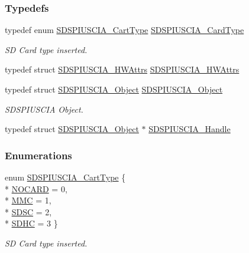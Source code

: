 \subsubsection*{Typedefs}
\begin{DoxyCompactItemize}
\item 
typedef enum \hyperlink{_s_d_s_p_i_u_s_c_i_a_8h_ad08dd3019effc5263edc6374ce89d87a}{S\-D\-S\-P\-I\-U\-S\-C\-I\-A\-\_\-\-Cart\-Type} \hyperlink{_s_d_s_p_i_u_s_c_i_a_8h_a5852060f107db1a20619f34ec6bc1f07}{S\-D\-S\-P\-I\-U\-S\-C\-I\-A\-\_\-\-Card\-Type}
\begin{DoxyCompactList}\small\item\em S\-D Card type inserted. \end{DoxyCompactList}\item 
typedef struct \hyperlink{struct_s_d_s_p_i_u_s_c_i_a___h_w_attrs}{S\-D\-S\-P\-I\-U\-S\-C\-I\-A\-\_\-\-H\-W\-Attrs} \hyperlink{_s_d_s_p_i_u_s_c_i_a_8h_a56139edab3ed8a47f5663415ccf8e97d}{S\-D\-S\-P\-I\-U\-S\-C\-I\-A\-\_\-\-H\-W\-Attrs}
\item 
typedef struct \hyperlink{struct_s_d_s_p_i_u_s_c_i_a___object}{S\-D\-S\-P\-I\-U\-S\-C\-I\-A\-\_\-\-Object} \hyperlink{_s_d_s_p_i_u_s_c_i_a_8h_a003d291f9dd29f2cd606896308a2c26a}{S\-D\-S\-P\-I\-U\-S\-C\-I\-A\-\_\-\-Object}
\begin{DoxyCompactList}\small\item\em S\-D\-S\-P\-I\-U\-S\-C\-I\-A Object. \end{DoxyCompactList}\item 
typedef struct \hyperlink{struct_s_d_s_p_i_u_s_c_i_a___object}{S\-D\-S\-P\-I\-U\-S\-C\-I\-A\-\_\-\-Object} $\ast$ \hyperlink{_s_d_s_p_i_u_s_c_i_a_8h_af66bd4e2d64495a7135faf286cee4c0c}{S\-D\-S\-P\-I\-U\-S\-C\-I\-A\-\_\-\-Handle}
\end{DoxyCompactItemize}
\subsubsection*{Enumerations}
\begin{DoxyCompactItemize}
\item 
enum \hyperlink{_s_d_s_p_i_u_s_c_i_a_8h_ad08dd3019effc5263edc6374ce89d87a}{S\-D\-S\-P\-I\-U\-S\-C\-I\-A\-\_\-\-Cart\-Type} \{ \\*
\hyperlink{_s_d_s_p_i_u_s_c_i_a_8h_ad08dd3019effc5263edc6374ce89d87aa422cdc20ba86c8cdcf1f0fd2318a1cfc}{N\-O\-C\-A\-R\-D} = 0, 
\\*
\hyperlink{_s_d_s_p_i_u_s_c_i_a_8h_ad08dd3019effc5263edc6374ce89d87aaa7d8fca3406f36682514f0384d910fac}{M\-M\-C} = 1, 
\\*
\hyperlink{_s_d_s_p_i_u_s_c_i_a_8h_ad08dd3019effc5263edc6374ce89d87aa87550a2102744c14e5e2e0ed39cc04b2}{S\-D\-S\-C} = 2, 
\\*
\hyperlink{_s_d_s_p_i_u_s_c_i_a_8h_ad08dd3019effc5263edc6374ce89d87aab27db2a19a825c3e6f1513cdab7c81ea}{S\-D\-H\-C} = 3
 \}
\begin{DoxyCompactList}\small\item\em S\-D Card type inserted. \end{DoxyCompactList}\end{DoxyCompactItemize}
